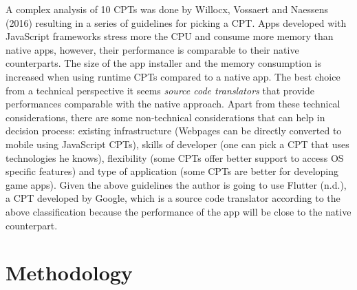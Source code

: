 \documentclass[version=last,fontsize=13pt]{scrartcl}
\begin{document}
	\indent
	A complex analysis of 10  CPTs was done by Willocx, Vossaert and Naessens (2016) resulting in a series of guidelines for picking a CPT. Apps developed with JavaScript frameworks stress more the CPU and consume more memory than native apps, however, their performance is comparable to their native counterparts. The size of the app installer and the memory consumption is increased when using runtime CPTs compared to a native app. The best choice from a technical perspective it seems \textit{source code translators} that provide performances comparable with the native approach. Apart from these technical considerations, there are some non-technical considerations that can help in decision process: existing infrastructure (Webpages can be directly converted to mobile using JavaScript CPTs), skills of developer (one can pick a CPT that uses technologies he knows), flexibility (some CPTs offer better support to access OS specific features) and type of application (some CPTs are better for developing game apps). Given the above guidelines the author is going to use Flutter (n.d.), a CPT developed by Google, which is a source code translator according to the above classification because the performance of the app will be close to the native counterpart.


\section{Methodology}%


\end{document}
